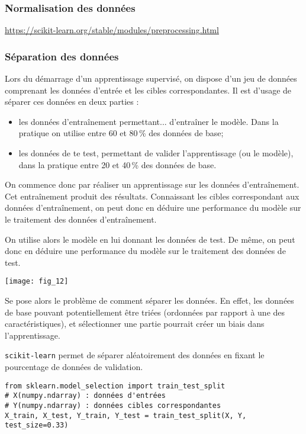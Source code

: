 \subsubsection{Normalisation des données}

\url{https://scikit-learn.org/stable/modules/preprocessing.html}

\subsubsection{Séparation des données}

Lors du démarrage d'un apprentissage supervisé, on dispose d'un jeu de données comprenant les données d'entrée et les cibles correspondantes. Il est d'usage de séparer ces données en deux parties :
\begin{itemize}
\item les données d’entraînement permettant... d’entraîner le modèle. Dans la pratique on utilise entre 60 et 80\,\% des données de base;
\item les données de te test, permettant de valider l'apprentissage (ou le modèle), dans la pratique entre 20 et 40\,\% des données de base.
\end{itemize}

On commence donc par réaliser un apprentissage sur les données d’entraînement. Cet entraînement produit des résultats. Connaissant les cibles correspondant aux données d'entraînement, on peut donc en déduire une performance du modèle sur le traitement des données d’entraînement. 

On utilise alors le modèle en lui donnant les données de test. De même, on peut donc en déduire une performance du modèle sur le traitement des données de test.  

\begin{center}
\texttt{[image: fig\_12]}
\end{center}

 Se pose alors le problème de comment séparer les données. En effet, les données de base pouvant potentiellement être triées (ordonnées par rapport à une des caractéristiques), et sélectionner une partie pourrait créer un biais dans l'apprentissage. 

\texttt{scikit-learn} permet de séparer aléatoirement des données en fixant le pourcentage de données de validation.


\begin{lstlisting}
from sklearn.model_selection import train_test_split
# X(numpy.ndarray) : données d'entrées
# Y(numpy.ndarray) : données cibles correspondantes
X_train, X_test, Y_train, Y_test = train_test_split(X, Y, test_size=0.33)
\end{lstlisting}


